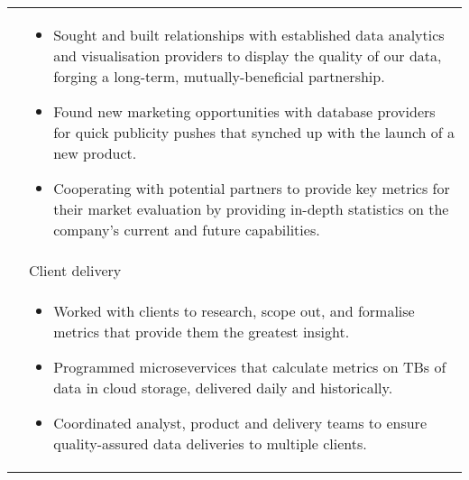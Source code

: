 \documentclass[a4paper,10pt]{article}
\newcommand{\tab}{\hspace{10 pt}}
\begin{document}
\begin{tabular}{p{2.25cm}|p{15cm}}
	 & \vspace{-0.07 in}\begin{itemize}
	\item Sought and built relationships with established data analytics and visualisation providers to display the quality of our data, forging a long-term, mutually-beneficial partnership.
	\item Found new marketing opportunities with database providers for quick publicity pushes that synched up with the launch of a new product.
	\item Cooperating with potential partners to provide key metrics for their market evaluation by providing in-depth statistics on the company's current and future capabilities.
	\end{itemize}\vspace{-0.15 in}\\ 
	 & \tab \large{Client delivery}\\
	 & \vspace{-0.07 in}\begin{itemize}
	\item Worked with clients to research, scope out, and formalise metrics that provide them the greatest insight.
	\item Programmed microsevervices that calculate metrics on TBs of data in cloud storage, delivered daily and historically.
	\item Coordinated analyst, product and delivery teams to ensure quality-assured data deliveries to multiple clients.   
	\end{itemize}\vspace{-0.15 in}\\
\end{tabular}
\end{document}

